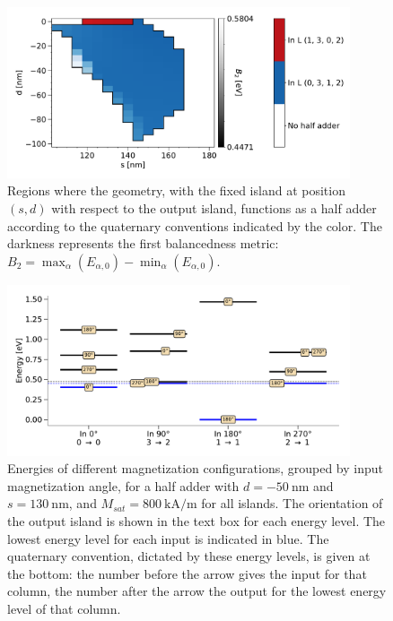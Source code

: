 \documentclass[11pt,a4paper,english]{article}
\begin{document}
\begin{figure}
    \centering
    \includegraphics[width=0.9\textwidth]{Figures/half_adder/sweep/000006_d-s/tableside(d0-100_5,s100-180_5)_balanced2.pdf}
    \caption{Regions where the geometry, with the fixed island at position $(s, d)$ with respect to the output island, functions as a half adder according to the quaternary conventions indicated by the color. The darkness represents the first balancedness metric: $B_2 = \max_\alpha(E_{\alpha,0}) - \min_\alpha(E_{\alpha,0})$.} 
    \label{fig:HalfAdder_000006_sweepnew_d-s_balanced2}
\end{figure}
\begin{figure}
    \centering
    \includegraphics[width=0.9\textwidth]{Figures/half_adder/energylevels/tableside(d50,s130)_energylevels.pdf}
    \caption{Energies of different magnetization configurations, grouped by input magnetization angle, for a half adder with $d=\SI{-50}{\nano\metre}$ and $s=\SI{130}{\nano\metre}$, and $M_{sat} = \SI{800}{\kilo\ampere\per\metre}$ for all islands. The orientation of the output island is shown in the text box for each energy level. The lowest energy level for each input is indicated in blue. The quaternary convention, dictated by these energy levels, is given at the bottom: the number before the arrow gives the input for that column, the number after the arrow the output for the lowest energy level of that column.}
    \label{fig:HalfAdder_000006_energylevels_d50_s130}
\end{figure}
\end{document}
